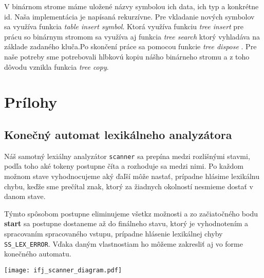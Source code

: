\documentclass[12pt, a4paper]{article}
\begin{document}
				V binárnom strome máme uložené názvy symbolou ich data, ich typ a konkrétne id. Naša implementácia je napísaná rekurzívne. Pre vkladanie nových symbolov sa využíva funkcia \textit{table insert symbol}. Ktorá využíva funkciu \textit{tree insert} pre prácu so binárnym stromom sa využíva aj funkcia \textit{tree search} ktorý vyhladáva na základe zadaného kluča.Po skončení práce sa pomocou funkcie \textit{tree dispose} . Pre naše potreby sme potrebovali hlbkovú kopiu nášho binárneho stromu a z toho dôvodu vznikla funkcia \textit{tree copy}.
	\section{Prílohy}
        \subsection{Konečný automat lexikálneho analyzátora} \label{sec:KA}
        Náš samotný lexiálny analyzátor \texttt{scanner} sa prepína medzi rozlišnými stavmi, podľa toho aké tokeny postupne číta a rozhoduje sa medzi nimi. Po každom možnom stave vyhodnocujeme aký ďaľší môže nastať, prípadne hlásime lexikálnu chybu, keďže sme prečítal znak, ktorý za žiadnych okolností nesmieme dostať v danom stave.

        Týmto spôsobom postupne eliminujeme všetkz možnosti a zo začiatočného bodu \textbf{start} sa postupne dostaneme až do finálneho stavu, ktorý je vyhodnotením a spracovaním spracovaného vstupu, prípadne hlásenie lexikálnej chyby \verb|SS_LEX_ERROR|. Vďaka daným vlastnostiam ho môžeme zakresliť aj vo forme konečného automatu.

	    \begin{center}
	    	\texttt{[image: ifj\_scanner\_diagram.pdf]}
	    \end{center}
\end{document}
